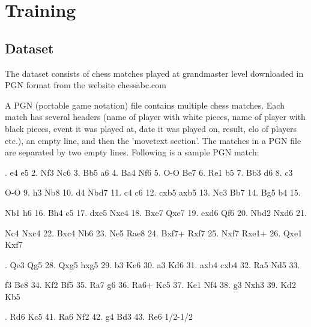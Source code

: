\chapter{Training}
\label{chap:ch4}

\section{Dataset}
\label{sec:ch4sec1}

The dataset consists of chess matches played at grandmaster level downloaded in PGN format from the website chessabc.com\cite{chessabc}

A PGN (portable game notation) file contains multiple chess matches. Each match has several headers (name of player with white pieces, name of player with black pieces, event it was played at, date it was played on, result, elo of players etc.), an empty line, and then the 'movetext section'. The matches in a PGN file are separated by two empty lines. Following is a sample PGN match:
\vspace*{\baselineskip}



\noindent [Date "1992.11.04"]

\noindent [Round "29"]



\noindent [Result "1/2-1/2"]
\vspace*{\baselineskip}

. e4 e5 2. Nf3 Nc6 3. Bb5 a6 4. Ba4 Nf6 5. O-O Be7 6. Re1 b5 7. Bb3 d6 8. c3

\noindent O-O 9. h3 Nb8 10. d4 Nbd7 11. c4 c6 12. cxb5 axb5 13. Nc3 Bb7 14. Bg5 b4 15.

\noindent Nb1 h6 16. Bh4 c5 17. dxe5 Nxe4 18. Bxe7 Qxe7 19. exd6 Qf6 20. Nbd2 Nxd6 21.

\noindent Nc4 Nxc4 22. Bxc4 Nb6 23. Ne5 Rae8 24. Bxf7+ Rxf7 25. Nxf7 Rxe1+ 26. Qxe1 Kxf7

. Qe3 Qg5 28. Qxg5 hxg5 29. b3 Ke6 30. a3 Kd6 31. axb4 cxb4 32. Ra5 Nd5 33.

\noindent f3 Bc8 34. Kf2 Bf5 35. Ra7 g6 36. Ra6+ Kc5 37. Ke1 Nf4 38. g3 Nxh3 39. Kd2 Kb5

. Rd6 Kc5 41. Ra6 Nf2 42. g4 Bd3 43. Re6 1/2-1/2
\vspace*{\baselineskip}

